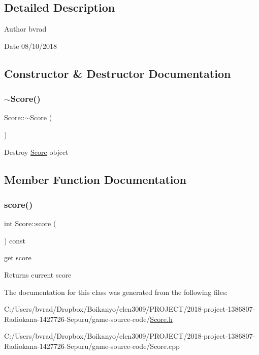 \subsection{Detailed Description}
\begin{DoxyAuthor}{Author}
bvrad 
\end{DoxyAuthor}
\begin{DoxyDate}{Date}
08/10/2018 
\end{DoxyDate}


\subsection{Constructor \& Destructor Documentation}
\mbox{\label{class_score_a54ab36a6fdd88696f0176d9534a76883}} 
\subsubsection{\texorpdfstring{$\sim$\+Score()}{~Score()}}
{\footnotesize\ttfamily Score\+::$\sim$\+Score (\begin{DoxyParamCaption}{ }\end{DoxyParamCaption})}

Destroy \mbox{\hyperlink{class_score}{Score}} object 

\subsection{Member Function Documentation}
\mbox{\label{class_score_a4df9075ea876a3b9c09d933f3c5ebee8}} 
\subsubsection{\texorpdfstring{score()}{score()}}
{\footnotesize\ttfamily int Score\+::score (\begin{DoxyParamCaption}{ }\end{DoxyParamCaption}) const}



get score 

\begin{DoxyReturn}{Returns}
current score 
\end{DoxyReturn}


The documentation for this class was generated from the following files\+:\begin{DoxyCompactItemize}
\item 
C\+:/\+Users/bvrad/\+Dropbox/\+Boikanyo/elen3009/\+P\+R\+O\+J\+E\+C\+T/2018-\/project-\/1386807-\/\+Radiokana-\/1427726-\/\+Sepuru/game-\/source-\/code/\mbox{\hyperlink{_score_8h}{Score.\+h}}\item 
C\+:/\+Users/bvrad/\+Dropbox/\+Boikanyo/elen3009/\+P\+R\+O\+J\+E\+C\+T/2018-\/project-\/1386807-\/\+Radiokana-\/1427726-\/\+Sepuru/game-\/source-\/code/Score.\+cpp\end{DoxyCompactItemize}
